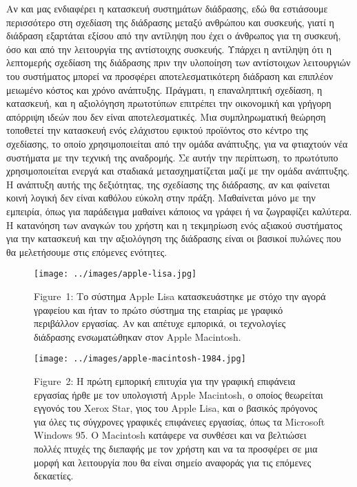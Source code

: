 \documentclass[
]{article}
\begin{document}
Αν και μας ενδιαφέρει η κατασκευή συστημάτων διάδρασης, εδώ θα
εστιάσουμε περισσότερο στη σχεδίαση της διάδρασης μεταξύ ανθρώπου και
συσκευής, γιατί η διάδραση εξαρτάται εξίσου από την αντίληψη που έχει ο
άνθρωπος για τη συσκευή, όσο και από την λειτουργία της αντίστοιχης
συσκευής. Υπάρχει η αντίληψη ότι η λεπτομερής σχεδίαση της διάδρασης
πριν την υλοποίηση των αντίστοιχων λειτουργιών του συστήματος μπορεί να
προσφέρει αποτελεσματικότερη διάδραση και επιπλέον μειωμένο κόστος και
χρόνο ανάπτυξης. Πράγματι, η επαναληπτική σχεδίαση, η κατασκευή, και η
αξιολόγηση πρωτοτύπων επιτρέπει την οικονομική και γρήγορη απόρριψη
ιδεών που δεν είναι αποτελεσματικές. Μια συμπληρωματική θεώρηση
τοποθετεί την κατασκευή ενός ελάχιστου εφικτού προϊόντος στο κέντρο της
σχεδίασης, το οποίο χρησιμοποιείται από την ομάδα ανάπτυξης, για να
φτιαχτούν νέα συστήματα με την τεχνική της αναδρομής. Σε αυτήν την
περίπτωση, το πρωτότυπο χρησιμοποιείται ενεργά και σταδιακά
μετασχηματίζεται μαζί με την ομάδα ανάπτυξης. Η ανάπτυξη αυτής της
δεξιότητας, της σχεδίασης της διάδρασης, αν και φαίνεται κοινή λογική
δεν είναι καθόλου εύκολη στην πράξη. Μαθαίνεται μόνο με την εμπειρία,
όπως για παράδειγμα μαθαίνει κάποιος να γράφει ή να ζωγραφίζει καλύτερα.
Η κατανόηση των αναγκών του χρήστη και η τεκμηρίωση ενός αξιακού
συστήματος για την κατασκευή και την αξιολόγηση της διάδρασης είναι οι
βασικοί πυλώνες που θα μελετήσουμε στις επόμενες ενότητες.

\leavevmode{}%
\begin{figure}
\hypertarget{fig:apple-lisa}{%
\centering
\texttt{[image: ../images/apple-lisa.jpg]}
\caption{Figure~1: Το σύστημα Apple Lisa κατασκευάστηκε με στόχο την
αγορά γραφείου και ήταν το πρώτο σύστημα της εταιρίας με γραφικό
περιβάλλον εργασίας. Αν και απέτυχε εμπορικά, οι τεχνολογίες διάδρασης
ενσωματώθηκαν στον Apple Macintosh.}\label{fig:apple-lisa}
}
\end{figure}

\leavevmode{}%
\begin{figure}
\hypertarget{fig:apple-macintosh}{%
\centering
\texttt{[image: ../images/apple-macintosh-1984.jpg]}
\caption{Figure~2: Η πρώτη εμπορική επιτυχία για την γραφική επιφάνεια
εργασίας ήρθε με τον υπολογιστή Apple Macintosh, ο οποίος θεωρείται
εγγονός του Xerox Star, γιος του Apple Lisa, και ο βασικός πρόγονος για
όλες τις σύγχρονες γραφικές επιφάνειες εργασίας, όπως τα Microsoft
Windows 95. O Macintosh κατάφερε να συνθέσει και να βελτιώσει πολλές
πτυχές της διεπαφής με τον χρήστη και να τα προσφέρει σε μια μορφή και
λειτουργία που θα είναι σημείο αναφοράς για τις επόμενες
δεκαετίες.}\label{fig:apple-macintosh}
}
\end{figure}
\end{document}
